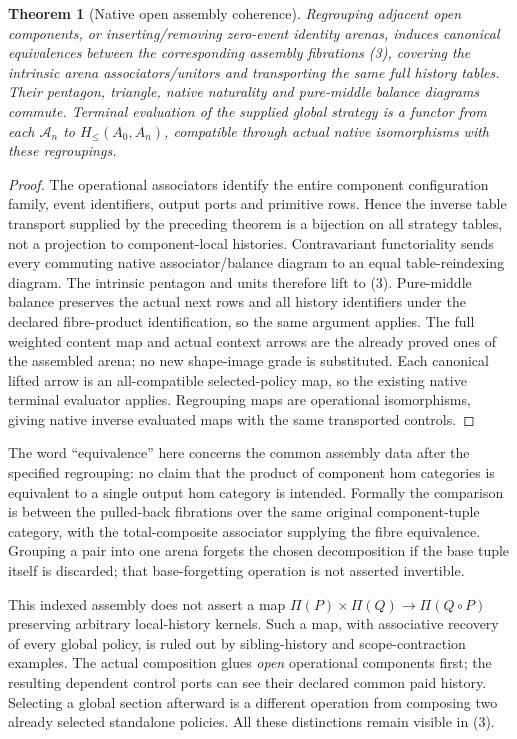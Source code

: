 \documentclass[11pt]{article}
\newtheorem{theorem}{Theorem}\newtheorem{proposition}[theorem]{Proposition}
\begin{document}
\begin{theorem}[Native open assembly coherence]
Regrouping adjacent open components, or inserting/removing zero-event identity arenas, induces canonical equivalences between the corresponding assembly fibrations (3), covering the intrinsic arena associators/unitors and transporting the same full history tables. Their pentagon, triangle, native naturality and pure-middle balance diagrams commute. Terminal evaluation of the supplied global strategy is a functor from each $\mathcal A_n$ to $H_{\leq}(A_0,A_n)$, compatible through actual native isomorphisms with these regroupings.
\end{theorem}
\begin{proof}
The operational associators identify the entire component configuration family, event identifiers, output ports and primitive rows. Hence the inverse table transport supplied by the preceding theorem is a bijection on all strategy tables, not a projection to component-local histories. Contravariant functoriality sends every commuting native associator/balance diagram to an equal table-reindexing diagram. The intrinsic pentagon and units therefore lift to (3). Pure-middle balance preserves the actual next rows and all history identifiers under the declared fibre-product identification, so the same argument applies. The full weighted content map and actual context arrows are the already proved ones of the assembled arena; no new shape-image grade is substituted. Each canonical lifted arrow is an all-compatible selected-policy map, so the existing native terminal evaluator applies. Regrouping maps are operational isomorphisms, giving native inverse evaluated maps with the same transported controls.\end{proof}

The word ``equivalence'' here concerns the common assembly data after the specified regrouping: no claim that the product of component hom categories is equivalent to a single output hom category is intended. Formally the comparison is between the pulled-back fibrations over the same original component-tuple category, with the total-composite associator supplying the fibre equivalence. Grouping a pair into one arena forgets the chosen decomposition if the base tuple itself is discarded; that base-forgetting operation is not asserted invertible.

This indexed assembly does not assert a map $\Pi(P)\times\Pi(Q)\to\Pi(Q\circ P)$ preserving arbitrary local-history kernels. Such a map, with associative recovery of every global policy, is ruled out by sibling-history and scope-contraction examples. The actual composition glues \emph{open} operational components first; the resulting dependent control ports can see their declared common paid history. Selecting a global section afterward is a different operation from composing two already selected standalone policies. All these distinctions remain visible in (3).
\end{document}
